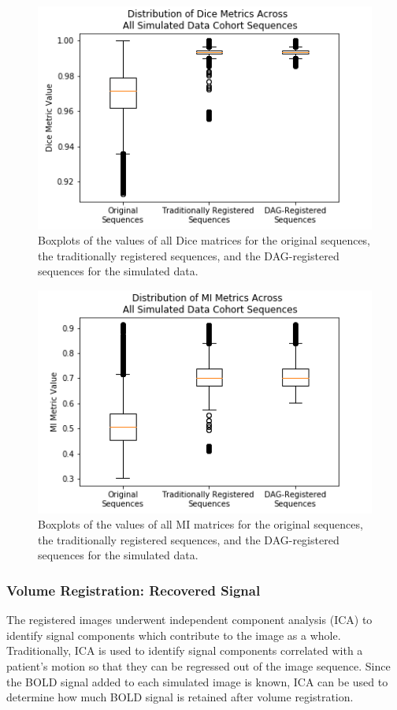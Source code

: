 \begin{figure}
\centering
\includegraphics[height=0.3\textheight]{6/figures/spectr-dice-box.png}
\caption{Boxplots of the values of all Dice matrices for the original sequences, the traditionally registered sequences, and the DAG-registered sequences for the simulated data.}
\label{fig:spectr-dice-box}
\end{figure}

\begin{figure}
\centering
\includegraphics[height=0.3\textheight]{6/figures/spectr-mi-box.png}
\caption{Boxplots of the values of all MI matrices for the original sequences, the traditionally registered sequences, and the DAG-registered sequences for the simulated data.}
\label{fig:spectr-mi-box}
\end{figure}


\subsubsection{Volume Registration: Recovered Signal}

The registered images underwent independent component analysis (ICA) to identify signal components which contribute to the image as a whole. Traditionally, ICA is used to identify signal components correlated with a patient's motion so that they can be regressed out of the image sequence. Since the BOLD signal added to each simulated image is known, ICA can be used to determine how much BOLD signal is retained after volume registration.

